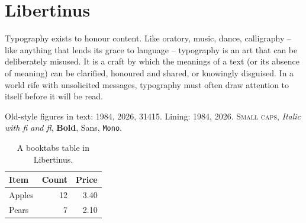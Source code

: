 \documentclass{article}
\begin{document}
\section{Libertinus}
Typography exists to honour content. Like oratory, music, dance, calligraphy -- like anything that lends its grace to language -- typography is an art that can be deliberately misused. It is a craft by which the meanings of a text (or its absence of meaning) can be clarified, honoured and shared, or knowingly disguised. In a world rife with unsolicited messages, typography must often draw attention to itself before it will be read.

Old-style figures in text: 1984, 2026, 31415. {Lining: 1984, 2026.}
\textsc{Small caps}, \textit{Italic with fi and fl}, \textbf{Bold}, \textsf{Sans}, \texttt{Mono}.

\begin{table}[h]\centering
\begin{tabular}{lrr}\toprule
Item & Count & Price\\\midrule
Apples & 12 & 3.40\\
Pears & 7 & 2.10\\\bottomrule
\end{tabular}
\caption{A booktabs table in Libertinus.}
\end{table}
\end{document}
